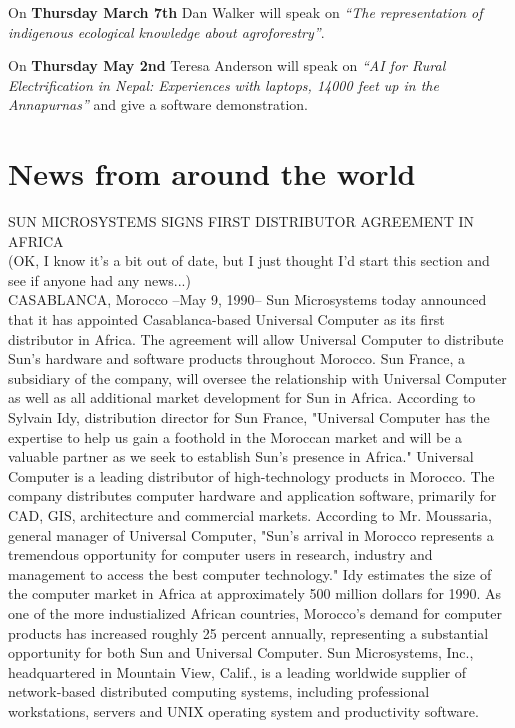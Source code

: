 On {\bf Thursday March 7th}
Dan Walker will speak on {\em  ``The representation of indigenous
ecological knowledge about agroforestry''}.

On {\bf Thursday May 2nd}
Teresa Anderson will speak on {\em ``AI for Rural Electrification in Nepal:
Experiences with laptops, 14000 feet up in the Annapurnas''}  and give
a software demonstration. 

\section{News from around the world}
SUN MICROSYSTEMS SIGNS FIRST DISTRIBUTOR AGREEMENT IN AFRICA\\
(OK, I know it's a bit out of date, but I just thought I'd start this
section and see if anyone had any news...)\\ 
 
CASABLANCA, Morocco --May 9, 1990-- Sun Microsystems today announced
that it has appointed Casablanca-based Universal Computer as its first
distributor in Africa.  The agreement will allow Universal Computer to
distribute Sun's hardware and software products throughout Morocco.
Sun France, a subsidiary of the company, will oversee the relationship
with Universal Computer as well as all additional market development
for Sun in Africa. According to Sylvain Idy, distribution director for
Sun France,  "Universal Computer has the expertise to help us gain a
foothold in the  Moroccan market and will be a valuable partner as we
seek to establish  Sun's presence in Africa."  Universal Computer is a
leading distributor of high-technology products in Morocco.  The
company distributes computer hardware and application software,
primarily for CAD, GIS, architecture and commercial markets. According
to Mr. Moussaria, general manager of Universal Computer, "Sun's
arrival in Morocco represents a tremendous opportunity for computer
users in research, industry and management to access the best computer
technology." Idy estimates the size of the computer market in Africa
at approximately 500 million dollars for 1990.  As one of the more
industialized African countries, Morocco's demand for computer
products has increased roughly 25 percent annually, representing a
substantial opportunity for both Sun and Universal Computer. Sun
Microsystems, Inc., headquartered in Mountain View, Calif., is a
leading worldwide supplier of network-based distributed computing
systems, including professional workstations, servers and UNIX
operating system and productivity software.
 
